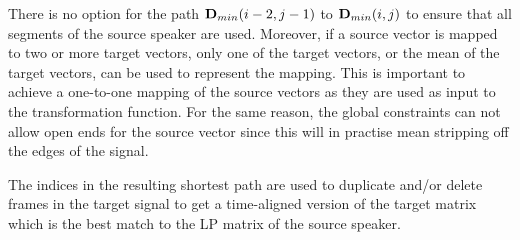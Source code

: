 \begin{remark}
There is no option for the path $\mathbf{D}_{min}(i-2,j-1)$ to $\mathbf{D}_{min}(i,j)$ to ensure that all segments of the source speaker are used. Moreover, if a source vector is mapped to two or more target vectors, only one of the target vectors, or the mean of the target vectors, can be used to represent the mapping. This is important to achieve a one-to-one mapping of the source vectors as they are used as input to the transformation function. For the same reason, the global constraints can not allow open ends for the source vector since this will in practise mean stripping off the edges of the signal.
\end{remark}

The indices in the resulting shortest path are used to duplicate and/or delete frames in the target signal to get a time-aligned version of the target matrix which is the best match to the LP matrix of the source speaker.



